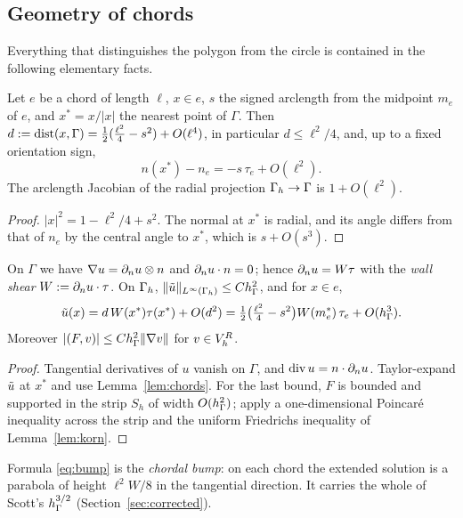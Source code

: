 \subsection{Geometry of chords}
Everything that distinguishes the polygon from the circle is contained in the following elementary facts.

\begin{lemma}[Chords]\label{lem:chords}
Let $e$ be a chord of length $\ell$, $x\in e$, $s$ the signed arclength from the midpoint $m_e$ of $e$, and $x^\ast=x/|x|$ the nearest point of $\Gamma$. Then $d:=\operatorname{dist}(x,\Gamma)=\frac12(\frac{\ell^2}4-s^2)+O(\ell^4)$, in particular $d\le\ell^2/4$, and, up to a fixed orientation sign,
\[
n(x^\ast)-n_e=-s\,\tau_e+O(\ell^2).
\]
The arclength Jacobian of the radial projection $\Gamma_h\to\Gamma$ is $1+O(\ell^2)$.
\end{lemma}

\begin{proof}
$|x|^2=1-\ell^2/4+s^2$. The normal at $x^\ast$ is radial, and its angle differs from that of $n_e$ by the central angle to $x^\ast$, which is $s+O(s^3)$.
\end{proof}

\begin{lemma}\label{lem:wall}
On $\Gamma$ we have $\nabla u=\partial_n u\otimes n$ and $\partial_n u\cdot n=0$; hence $\partial_n u=W\tau$ with the \emph{wall shear} $W:=\partial_n u\cdot\tau$. On $\Gamma_h$, $\lVert \tilde u\rVert_{L^\infty(\Gamma_h)}\le Ch_\Gamma^2$, and for $x\in e$,
\begin{equation}\label{eq:bump}
\tilde u(x)=d\,W(x^\ast)\tau(x^\ast)+O(d^2)=\tfrac12\bigl(\tfrac{\ell^2}4-s^2\bigr)W(m_e^\ast)\,\tau_e+O(h_\Gamma^3).
\end{equation}
Moreover $|(F,v)|\le Ch_\Gamma^2\lVert \nabla v\rVert$ for $v\in V_h^R$.
\end{lemma}

\begin{proof}
Tangential derivatives of $u$ vanish on $\Gamma$, and $\operatorname{div} u=n\cdot\partial_n u$. Taylor-expand $\tilde u$ at $x^\ast$ and use Lemma~\ref{lem:chords}. For the last bound, $F$ is bounded and supported in the strip $S_h$ of width $O(h_\Gamma^2)$; apply a one-dimensional Poincar\'e inequality across the strip and the uniform Friedrichs inequality of Lemma~\ref{lem:korn}.
\end{proof}

Formula \eqref{eq:bump} is the \emph{chordal bump}: on each chord the extended solution is a parabola of height $\ell^2W/8$ in the tangential direction. It carries the whole of Scott's $h_\Gamma^{3/2}$ (Section~\ref{sec:corrected}).

